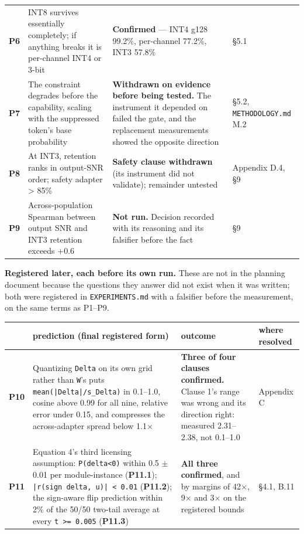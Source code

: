 \begin{table}[t]
\begin{tabularx}{\textwidth}{l>{\hsize=0.905\hsize\raggedright\arraybackslash}X>{\hsize=1.672\hsize\raggedright\arraybackslash}X>{\hsize=0.423\hsize\raggedright\arraybackslash}X}
\textbf{P6} & INT8 survives essentially completely; if anything breaks it is per-channel INT4 or 3-bit & \textbf{Confirmed} --- INT4 g128 99.2\%, per-channel 77.2\%, INT3 57.8\% & \S{}5.1 \\
\textbf{P7} & The constraint degrades before the capability, scaling with the suppressed token's base probability & \textbf{Withdrawn on evidence before being tested.} The instrument it depended on failed the gate, and the replacement measurements showed the opposite direction & \S{}5.2, \texttt{METHODOLOGY.\allowbreak{}md} M.2 \\
\textbf{P8} & At INT3, retention ranks in output-SNR order; safety adapter > 85\% & \textbf{Safety clause withdrawn} (its instrument did not validate); remainder untested & Appendix D.4, \S{}9 \\
\textbf{P9} & Across-population Spearman between output SNR and INT3 retention exceeds +0.6 & \textbf{Not run.} Decision recorded with its reasoning and its falsifier before the fact & \S{}9 \\
\bottomrule
\end{tabularx}
\end{table}

\textbf{Registered later, each before its own run.} These are not in the planning document because the questions they answer did not exist when it was written; both were registered in \texttt{EXPERIMENTS.\allowbreak{}md} with a falsifier before the measurement, on the same terms as P1--P9.

\begin{table}[t]
\centering\scriptsize
\begin{tabularx}{\textwidth}{l>{\hsize=1.316\hsize\raggedright\arraybackslash}X>{\hsize=0.684\hsize\raggedright\arraybackslash}Xl}
\toprule
 & prediction (final registered form) & outcome & where resolved \\
\midrule
\textbf{P10} & Quantizing \texttt{Delta} on its own grid rather than \texttt{W}'s puts \texttt{mean(|Delta|/\allowbreak{}s\_\allowbreak{}Delta)} in 0.1--1.0, cosine above 0.99 for all nine, relative error under 0.15, and compresses the across-adapter spread below 1.1$\times$ & \textbf{Three of four clauses confirmed.} Clause 1's range was wrong and its direction right: measured 2.31--2.38, not 0.1--1.0 & Appendix C \\
\textbf{P11} & Equation 4's third licensing assumption: \texttt{P(delta<0)} within 0.5 $\pm$ 0.01 per module-instance (\textbf{P11.1}); \texttt{|r(sign delta, u)| < 0.\allowbreak{}01} (\textbf{P11.2}); the sign-aware flip prediction within 2\% of the 50/50 two-tail average at every \texttt{t >= 0.\allowbreak{}005} (\textbf{P11.3}) & \textbf{All three confirmed}, and by margins of 42$\times$, 9$\times$ and 3$\times$ on the registered bounds & \S{}4.1, B.11 \\
\bottomrule
\end{tabularx}
\end{table}

